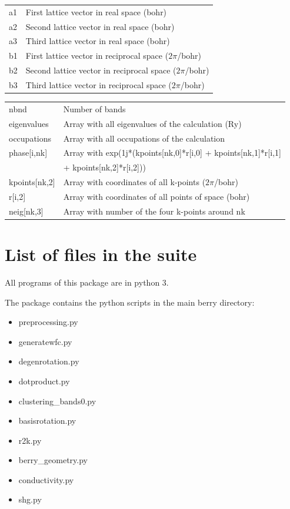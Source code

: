\documentclass[a4paper,12pt]{report}
\begin{document}
\begin{appendices}
\begin{tabularx}{0.9\textwidth}{lX}
 a1             & First lattice vector in real space (bohr) \\
 a2             & Second lattice vector in real space (bohr) \\
 a3             & Third lattice vector in real space (bohr) \\

 b1             & First lattice vector in reciprocal space ($2\pi$/bohr) \\
 b2             & Second lattice vector in reciprocal space ($2\pi$/bohr) \\
 b3             & Third lattice vector in reciprocal space ($2\pi$/bohr) \\
\end{tabularx}
\vspace{0.5cm}

\begin{tabularx}{0.9\textwidth}{lX}
 nbnd           & Number of bands \\

 eigenvalues    & Array with all eigenvalues of the calculation (Ry) \\
 occupations    & Array with all occupations of the calculation \\

 phase[i,nk]    & Array with exp(1j*(kpoints[nk,0]*r[i,0] + kpoints[nk,1]*r[i,1] \\
                & \hspace*{3cm}+ kpoints[nk,2]*r[i,2])) \\
 kpoints[nk,2]  & Array with coordinates of all k-points ($2\pi$/bohr) \\
 r[i,2]         & Array with coordinates of all points of space (bohr) \\

 neig[nk,3]     & Array with number of the four k-points around nk \\
\end{tabularx}


\chapter{List of files in the suite}
 All programs of this package are in python 3.

The package contains the python scripts in the main berry directory:
\begin{itemize}
 \item preprocessing.py
 \item generatewfc.py
 \item degenrotation.py
 \item dotproduct.py
 \item clustering\_bands0.py
 \item basisrotation.py
 \item r2k.py
 \item berry\_geometry.py
 \item conductivity.py
 \item shg.py
\end{itemize}\medskip


\end{appendices}
\end{document}
